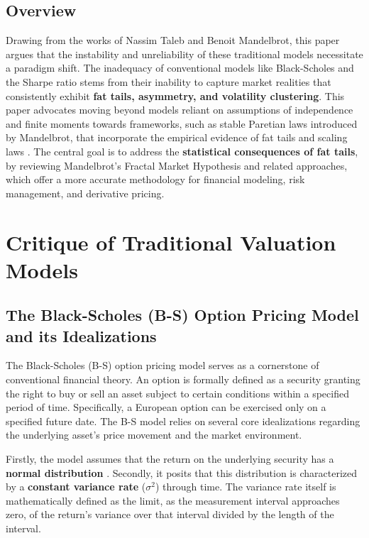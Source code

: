 \documentclass{ieeetj}
\begin{document}
\subsection{Overview}
Drawing from the works of Nassim Taleb and Benoit Mandelbrot, this paper argues that the instability and unreliability of these traditional models necessitate a paradigm shift. The inadequacy of conventional models like Black-Scholes and the Sharpe ratio stems from their inability to capture market realities that consistently exhibit \textbf{fat tails, asymmetry, and volatility clustering}. This paper advocates moving beyond models reliant on assumptions of independence and finite moments towards frameworks, such as stable Paretian laws introduced by Mandelbrot, that incorporate the empirical evidence of fat tails and scaling laws \cite{mandelbrot1963variation}. The central goal is to address the\textbf{ statistical consequences of fat tails}, by reviewing Mandelbrot’s Fractal Market Hypothesis and related approaches, which offer a more accurate methodology for financial modeling, risk management, and derivative pricing.

\section{Critique of Traditional Valuation Models}

\subsection{The Black-Scholes (B-S) Option Pricing Model and its Idealizations}
The Black-Scholes (B-S) option pricing model serves as a cornerstone of conventional financial theory. An option is formally defined as a security granting the right to buy or sell an asset subject to certain conditions within a specified period of time. Specifically, a European option can be exercised only on a specified future date. The B-S model relies on several core idealizations regarding the underlying asset’s price movement and the market environment.

Firstly, the model assumes that the return on the underlying security has a \textbf{normal distribution} \cite{macbethmerville1979}. Secondly, it posits that this distribution is characterized by a \textbf{constant variance rate} ($\sigma^2$) through time. The variance rate itself is mathematically defined as the limit, as the measurement interval approaches zero, of the return’s variance over that interval divided by the length of the interval.
\end{document}
